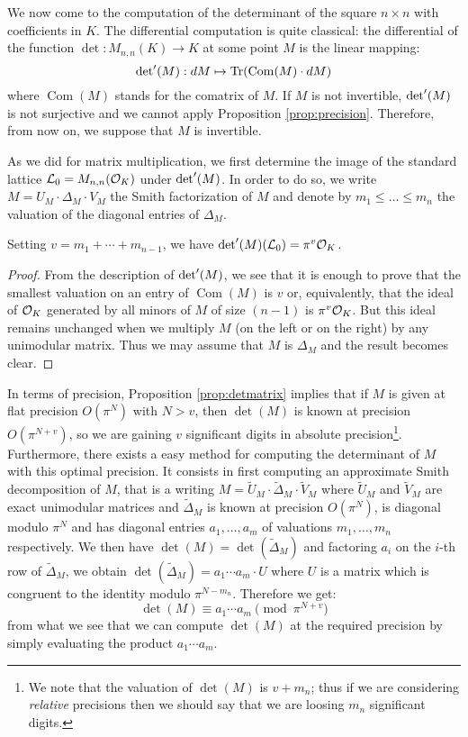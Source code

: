 \documentclass{sig-alternate}
\DeclareMathOperator{\tr}{Tr}
\DeclareMathOperator{\com}{Com}
\begin{document}
We now come to the computation of the determinant of the square $n 
\times n$ with coefficients in $K$. The differential computation is 
quite classical: the differential of the function $\det : M_{n,n}(K) \to 
K$ at some point $M$ is the linear mapping:
$$\detp(M) : dM \mapsto \tr(\com(M) \cdot dM)$$
where $\com(M)$ stands for the comatrix of $M$. If $M$ is not 
invertible, $\text{\rm det}'(M)$ is not surjective and we cannot apply Proposition 
\ref{prop:precision}. Therefore, from now on, we suppose that $M$ is invertible.

As we did for matrix multiplication, we first determine the image of
the standard lattice $\mathcal L_0 = M_{n,n}(\mathcal O_K)$ under $\text{\rm det}'(M)$.
In order to do so, we write $M = U_M \cdot \Delta_M \cdot V_M$ the 
Smith factorization of $M$ and denote by $m_1 \leq \ldots \leq m_n$ 
the valuation of the diagonal entries of $\Delta_M$.

\begin{prop}
\label{prop:detmatrix}
Setting $v = m_1 + \cdots + m_{n-1}$, we have
$\text{\rm det}'(M)(\mathcal L_0) = \pi^v \mathcal O_K$.
\end{prop}

\begin{proof}
From the description of $\text{\rm det}'(M)$, we see that it is enough to prove 
that the smallest valuation on an entry of $\com(M)$ is $v$
or, equivalently, that the ideal of $\mathcal O_K$ generated by all 
minors of $M$ of size $(n-1)$ is $\pi^v
\mathcal O_K$. But this ideal remains unchanged when we multiply $M$ 
(on the left or on the right) by any unimodular matrix. Thus we may 
assume that $M$ is $\Delta_M$ and the result becomes clear.
\end{proof}

In terms of precision, Proposition \ref{prop:detmatrix} implies that if 
$M$ is given at flat precision $O(\pi^N)$ with $N > v$, then $\det(M)$ 
is known at precision $O(\pi^{N+v})$, so we are gaining $v$ significant 
digits in absolute precision\footnote{We note that the valuation of 
$\det(M)$ is $v + m_n$; thus if we are considering \emph{relative} 
precisions then we should say that we are loosing $m_n$ significant 
digits.}.
Furthermore, there exists a easy method for computing the determinant
of $M$ with this optimal precision. It consists in first computing an
approximate Smith decomposition of $M$, that is a writing
$M = \tilde U_M \cdot \tilde \Delta_M \cdot \tilde V_M$
where $\tilde U_M$ and $\tilde V_M$ are exact unimodular matrices and
$\tilde \Delta_M$ is known at precision $O(\pi^N)$, is diagonal modulo
$\pi^N$ and has diagonal entries $a_1, \ldots, a_m$ of valuations 
$m_1, \ldots, m_n$ respectively.
We then have $\det(M) = \det(\tilde \Delta_M)$ and factoring $a_i$ on
the $i$-th row of $\tilde \Delta_M$, we obtain
$\det(\tilde \Delta_M) = a_1 \cdots a_m \cdot U$
where $U$ is a matrix which is congruent to the identity modulo 
$\pi^{N-m_n}$. Therefore we get:
$$\det(M) \equiv a_1 \cdots a_m \pmod{\pi^{N+v}}$$
from what we see that we can compute $\det(M)$ at the required precision
by simply evaluating the product $a_1 \cdots a_m$.
\end{document}
